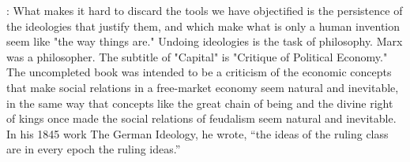 \documentclass[10pt, letterpaper]{article}
\newcommand{\emd}[1]{\ExecuteMetaData[/tmp/tex]{#1}} %
\begin{document}
\begin{spacing}{1.8}
\citet{menandMISC16oct3}:
What makes it hard to discard the tools we have objectified is the persistence of the ideologies that justify them, and which make what is only a human invention seem like "the way things are." Undoing ideologies is the task of philosophy. Marx was a philosopher. The subtitle of "Capital" is "Critique of Political Economy." The uncompleted book was intended to be a criticism of the economic concepts that make social relations in a free-market economy seem natural and inevitable, in the same way that concepts like the great chain of being and the divine right of kings once made the social relations of feudalism seem natural and inevitable.
%
In his 1845 work The German Ideology, he wrote, ``the ideas of the ruling class
are in every epoch the ruling ideas.''










\end{spacing}
\end{document}
